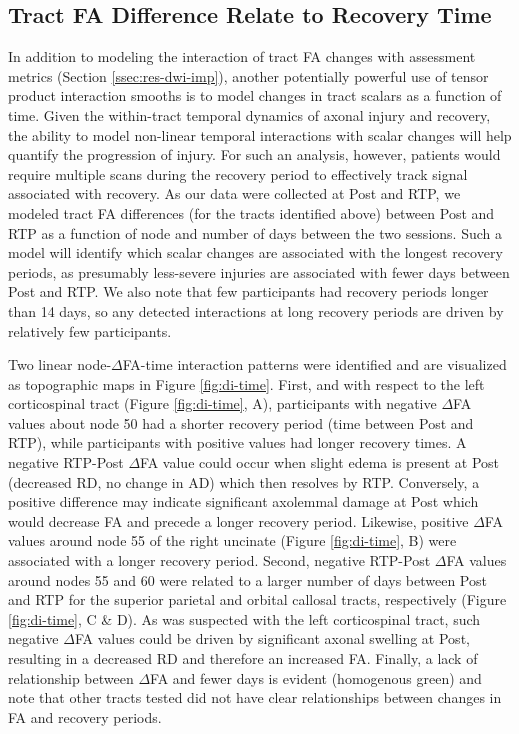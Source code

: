\documentclass[12pt]{article}
\begin{document}
\subsection{Tract FA Difference Relate to Recovery Time}
\label{ssec:res-dwi-time}
In addition to modeling the interaction of tract FA changes with assessment metrics (Section \ref{ssec:res-dwi-imp}), another potentially powerful use of tensor product interaction smooths is to model changes in tract scalars as a function of time. Given the within-tract temporal dynamics of axonal injury and recovery, the ability to model non-linear temporal interactions with scalar changes will help quantify the progression of injury. For such an analysis, however, patients would require multiple scans during the recovery period to effectively track signal associated with recovery. As our data were collected at Post and RTP, we modeled tract FA differences (for the tracts identified above) between Post and RTP as a function of node and number of days between the two sessions. Such a model will identify which scalar changes are associated with the longest recovery periods, as presumably less-severe injuries are associated with fewer days between Post and RTP. We also note that few participants had recovery periods longer than 14 days, so any detected interactions at long recovery periods are driven by relatively few participants.

Two linear node-$\Delta$FA-time interaction patterns were identified and are visualized as topographic maps in Figure \ref{fig:di-time}. First, and with respect to the left corticospinal tract (Figure \ref{fig:di-time}, A), participants with negative $\Delta$FA values about node 50 had a shorter recovery period (time between Post and RTP), while participants with positive values had longer recovery times. A negative RTP-Post $\Delta$FA value could occur when slight edema is present at Post (decreased RD, no change in AD) which then resolves by RTP. Conversely, a positive difference may indicate significant axolemmal damage at Post which would decrease FA and precede a longer recovery period. Likewise, positive $\Delta$FA values around node 55 of the right uncinate (Figure \ref{fig:di-time}, B) were associated with a longer recovery period. Second, negative RTP-Post $\Delta$FA values around nodes 55 and 60 were related to a larger number of days between Post and RTP for the superior parietal and orbital callosal tracts, respectively (Figure \ref{fig:di-time}, C \& D). As was suspected with the left corticospinal tract, such negative $\Delta$FA values could be driven by significant axonal swelling at Post, resulting in a decreased RD and therefore an increased FA. Finally, a lack of relationship between $\Delta$FA and fewer days is evident (homogenous green) and note that other tracts tested did not have clear relationships between changes in FA and recovery periods.
\end{document}
